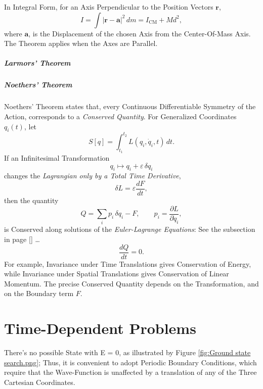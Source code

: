 \documentclass[a4paper, 10pt, onepage]{elegantbook}
\begin{document}
{In Integral Form, for an Axis Perpendicular to the Position Vectors $\mathbf{r}$,
\[
I=\int |\mathbf{r}-\mathbf{a}|^2\,dm
=I_{\mathrm{CM}}+Md^2,
\]
where $\mathbf{a}$, is the Displacement of the chosen Axis from the Center-Of-Mass Axis. The Theorem applies when the Axes are Parallel.

\newpage

\paragraph{Larmors' Theorem}

\noindent

















\paragraph{Noethers' Theorem}

\noindent

Noethers' Theorem states that, every Continuous Differentiable Symmetry of the Action, corresponds to a \emph{Conserved Quantity}. For Generalized Coordinates $q_i(t)$, let
\[
S[q]=\int_{t_1}^{t_2} L(q_i,\dot q_i,t)\,dt.
\]
If an Infinitesimal Transformation
\[
q_i\longmapsto q_i+\varepsilon\,\delta q_i
\]
changes the \emph{Lagrangian only by a Total Time Derivative},
\[
\delta L=\varepsilon\frac{dF}{dt},
\]
then the quantity
\[
Q=\sum_i p_i\,\delta q_i-F,
\qquad
p_i=\frac{\partial L}{\partial \dot q_i},
\]
is Conserved along solutions of the \emph{Euler-Lagrange Equations}: See the subsection in page [\pageref{ssec:Connection with the Classical Path}] \ldots
\[
\frac{dQ}{dt}=0.
\]
For example, Invariance under Time Translations gives Conservation of Energy, while Invariance under Spatial Translations gives Conservation of Linear Momentum. The precise Conserved Quantity depends on the Transformation, and on the Boundary term $F$.

\newpage

\chapter{Time-Dependent Problems}

There's no possible State with E = 0, as illustrated by Figure \ref{fig:Ground state search.png}; Thus, it is convenient to adopt Periodic Boundary Conditions, which require that the Wave-Function is unaffected by a translation of any of the Three Cartesian Coordinates.  \\

}
\end{document}
